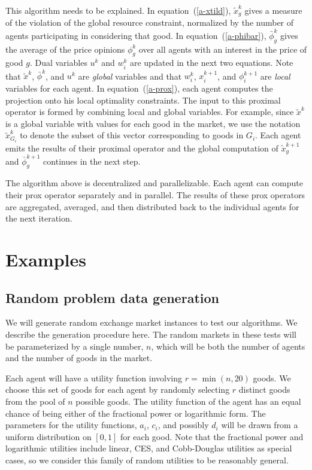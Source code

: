 \documentclass[12pt]{article}
\begin{document}
This algorithm needs to be explained.
In equation~(\ref{a-xtild}), $\tilde{x}^k_g$ gives a measure of the violation of
the global resource constraint, normalized by the number of agents participating
in considering that good.
In equation~(\ref{a-phibar}), $\bar{\phi}^k_g$ gives the average of the price
opinions $\phi^k_g$ over all agents with an interest in the price of good $g$.
Dual variables $u^k$ and $w^k_i$ are updated in the next two equations.
Note that $\tilde{x}^k$, $\bar{\phi}^k$, and $u^k$ are \emph{global} variables
and that $w_i^k$, $x_i^{k+1}$, and $\phi_i^{k+1}$ are \emph{local} variables
for each agent. In equation~(\ref{a-prox}), each agent computes the projection
onto his local optimality constraints.
The input to this proximal operator is formed by combining
local and global variables.
For example, since $\tilde{x}^k$ is a global variable with values for each good in the market, we use the notation $\tilde{x}^k_{G_i}$ to denote the subset of this vector corresponding to goods in $G_i$.
Each agent emits the results of their proximal operator and the
global computation of $\tilde{x}^{k+1}_g$ and $\bar{\phi}^{k+1}_g$ continues in the next step.

The algorithm above is decentralized and parallelizable.
Each agent can compute their prox operator separately and in parallel.
The results of these prox operators are aggregated, averaged, and then distributed
back to the individual agents for the next iteration.





\section{Examples}
\subsection{Random problem data generation}
\label{sec:random_prob}
We will generate random exchange market instances to test our algorithms.
We describe the generation procedure here.
The random markets in these tests will be parameterized
by a single number, $n$, which will be both the
number of agents and the number of goods in the market.

Each agent will have a utility function involving $r = \min(n,20)$
goods.
We choose this set of goods for each agent by randomly selecting
$r$ distinct goods from the pool of $n$ possible goods.
The utility function of the agent has an equal chance of 
being either of the fractional power or logarithmic form.
The parameters for the utility functions, $a_i$, $c_i$, and possibly
$d_i$ will be drawn from a uniform distribution on $[0,1]$ for each good.
Note that the fractional power and logarithmic utilities include
linear, CES, and Cobb-Douglas utilities as special cases,
so we consider this family of random utilities to be reasonably general.
\end{document}
